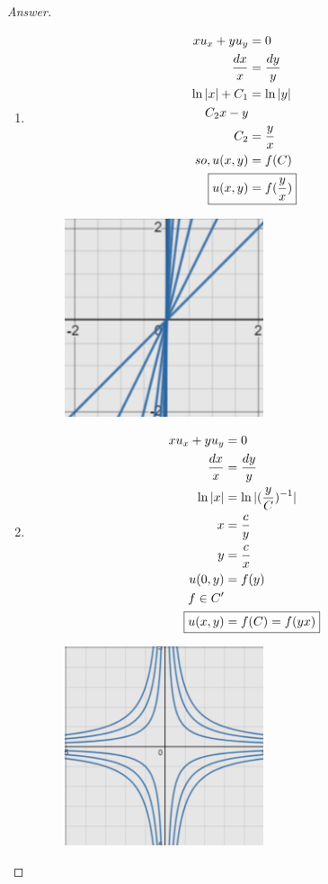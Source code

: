 \documentclass{article}
\theoremstyle{definition}
\renewcommand\qedsymbol{$\blacksquare$}
\newenvironment{ans}{\begin{proof}[Answer]\renewcommand{\qedsymbol}{}}{\end{proof}}
\begin{document}
	\begin{ans}
		\begin{enumerate}[resume*=answers]
			\item
		\begin{align*}xu_x + yu_y &= 0\\
				\frac{dx}{x} &= \frac{dy}{y} \\
				\ln|x| + C_1 &= \ln|y| \\
				C_2x -y \\
				C_2 &= \frac{y}{x} \\
			so, u(x, y) &= f(C) \\
			\Aboxed{u(x, y) &= f(\frac{y}{x})} \\ \end{align*}

		\begin{figure}[H]
                        \centering
                        \includegraphics[width=2.3in]{14 graph.png}

                    \end{figure}
			
			\item \begin{align*}xu_x + yu_y &= 0\\
				\frac{dx}{x} &= \frac{dy}{y} \\
				\ln|x| &= \ln|(\frac{y}{C})^{-1}| \\
				x &= \frac{c}{y}\\
				y &= \frac{c}{x}\\
				u(0, y) &= f(y) \\
				f \in C'\\
			\Aboxed{u(x, y) &= f(C) = f(yx)} \\ \end{align*}

		\begin{figure}[H]
                        \centering
                        \includegraphics[width=2.3in]{15 graph.png}


\end{figure}
\end{enumerate}
\end{ans}
\end{document}
